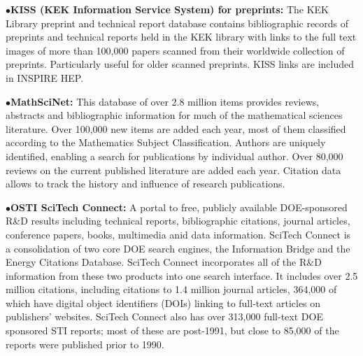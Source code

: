   \item{}

\medskip

\item{$\bullet$}{\bf KISS (KEK Information Service System) for preprints:}
The KEK Library preprint and technical report database contains bibliographic records of preprints and technical reports held in the KEK library with links to the full text images of more than 100,000 papers scanned from their worldwide collection of preprints. Particularly useful for older scanned preprints. KISS links are included in INSPIRE HEP.
   \item{}
\medskip

\medskip

\item{$\bullet$}{\bf MathSciNet:}
This database of over 2.8 million items provides reviews, abstracts and bibliographic information for much of the mathematical sciences literature. Over 100,000 new items are added each year, most of them classified according to the Mathematics Subject Classification. Authors are uniquely identified, enabling a search for publications by individual author. Over 80,000 reviews on the current published literature are added each year. Citation data allows to track the history and influence of research publications.
   \item{}


\item{$\bullet$}{\bf OSTI SciTech Connect:}
A portal to free, publicly available DOE-sponsored R\&D results including technical reports, bibliographic citations, journal articles, conference papers, books, multimedia anid data information. SciTech Connect is a consolidation of two core DOE search engines, the Information Bridge and the Energy Citations Database. SciTech Connect incorporates all of the R\&D information from these two products into one search interface. It includes over 2.5 million citations, including citations to 1.4 million journal articles, 364,000 of which have digital object identifiers (DOIs) linking to full-text articles on publishers' websites. SciTech Connect also has over 313,000 full-text DOE sponsored STI reports; most of these are post-1991, but close to 85,000 of the reports were published prior to 1990.

   \item{}


